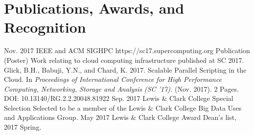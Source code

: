 \documentclass[10pt]{article} %
\begin{document}



\section{Publications, Awards, and Recognition}
\award
{Nov. 2017}
{ }
{IEEE and ACM SIGHPC}
{https://sc17.supercomputing.org}
{Publication (Poster)}
{Work relating to cloud computing infrastructure published at SC 2017. \\ Glick, B.H., Babuji, Y.N., and Chard, K. 2017. Scalable Parallel Scripting in the Cloud. In \textit{Proceedings of International Conference for High Performance Computing, Networking, Storage and Analysis (SC '17).} (Nov. 2017). 2 Pages. DOI: 10.13140/RG.2.2.20048.81922}
\award
{Sep. 2017}
{ }
{Lewis \& Clark College}
{ }
{Special Selection}
{Selected to be a member of the Lewis \& Clark College Big Data Uses and Applications Group.}
\award
{May 2017}
{ }
{Lewis \& Clark College}
{}
{Award}
{Dean's list, 2017 Spring.}
\end{document}
